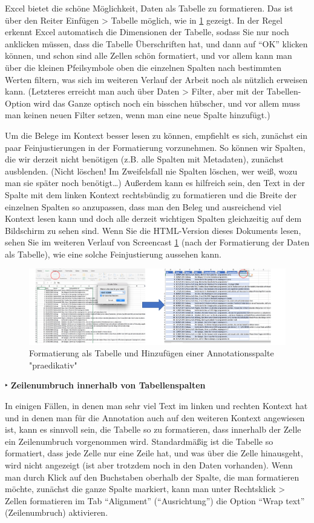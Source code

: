 \documentclass[]{article}
\begin{document}
Excel bietet die schöne Möglichkeit, Daten als Tabelle zu formatieren.
Das ist über den Reiter Einfügen \textgreater{} Tabelle möglich, wie in
\ref{fig:excelastable} gezeigt. In der Regel erkennt Excel automatisch
die Dimensionen der Tabelle, sodass Sie nur noch anklicken müssen, dass
die Tabelle Überschriften hat, und dann auf ``OK'' klicken können, und
schon sind alle Zellen schön formatiert, und vor allem kann man über die
kleinen Pfeilsymbole oben die einzelnen Spalten nach bestimmten Werten
filtern, was sich im weiteren Verlauf der Arbeit noch als nützlich
erweisen kann. (Letzteres erreicht man auch über Daten \textgreater{}
Filter, aber mit der Tabellen-Option wird das Ganze optisch noch ein
bisschen hübscher, und vor allem muss man keinen neuen Filter setzen,
wenn man eine neue Spalte hinzufügt.)

Um die Belege im Kontext besser lesen zu können, empfiehlt es sich,
zunächst ein paar Feinjustierungen in der Formatierung vorzunehmen. So
können wir Spalten, die wir derzeit nicht benötigen (z.B. alle Spalten
mit Metadaten), zunächst ausblenden. (Nicht löschen! Im Zweifelsfall nie
Spalten löschen, wer weiß, wozu man sie später noch benötigt\ldots{})
Außerdem kann es hilfreich sein, den Text in der Spalte mit dem linken
Kontext rechtsbündig zu formatieren und die Breite der einzelnen Spalten
so anzupassen, dass man den Beleg und ausreichend viel Kontext lesen
kann und doch alle derzeit wichtigen Spalten gleichzeitig auf dem
Bildschirm zu sehen sind. Wenn Sie die HTML-Version dieses Dokuments
lesen, sehen Sie im weiteren Verlauf von Screencast
\ref{fig:excelastable} (nach der Formatierung der Daten als Tabelle),
wie eine solche Feinjustierung aussehen kann.

\begin{figure}
\includegraphics[width=6.66in]{fig/excelastable01} \caption{Formatierung als Tabelle und Hinzufügen einer Annotationsspalte "praedikativ"}\label{fig:excelastable}
\end{figure}

 ‣ \textbf{Zeilenumbruch innerhalb von Tabellenspalten}

In einigen Fällen, in denen man sehr viel Text im linken und rechten
Kontext hat und in denen man für die Annotation auch auf den weiteren
Kontext angewiesen ist, kann es sinnvoll sein, die Tabelle so zu
formatieren, dass innerhalb der Zelle ein Zeilenumbruch vorgenommen
wird. Standardmäßig ist die Tabelle so formatiert, dass jede Zelle nur
eine Zeile hat, und was über die Zelle hinausgeht, wird nicht angezeigt
(ist aber trotzdem noch in den Daten vorhanden). Wenn man durch Klick
auf den Buchstaben oberhalb der Spalte, die man formatieren möchte,
zunächst die ganze Spalte markiert, kann man unter Rechtsklick
\textgreater{} Zellen formatieren im Tab ``Alignment'' (``Ausrichtung'')
die Option ``Wrap text'' (Zeilenumbruch) aktivieren.
\end{document}

